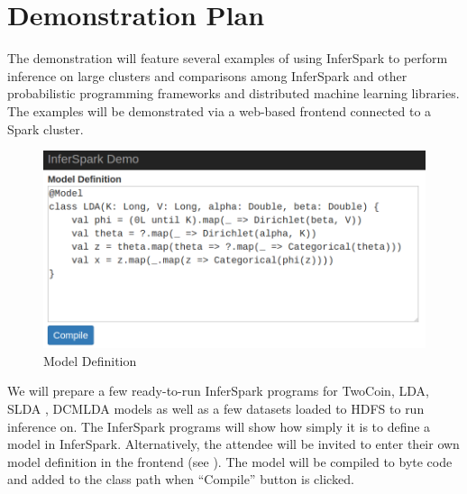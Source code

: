\section{Demonstration Plan}
\label{sec:demoplan}


The demonstration will feature several examples of using InferSpark to perform
inference on large clusters and comparisons among InferSpark and other
probabilistic programming frameworks and distributed machine learning
libraries. The examples will be demonstrated via a web-based frontend
connected to a Spark cluster.

\begin{figure}[!h]
    \includegraphics[width=\linewidth]{figs/demo_modeldef.png}
    \vspace*{-10pt}
    \caption{Model Definition}
    \label{fig:demo_modeldef}
\end{figure}

We will prepare a few ready-to-run InferSpark programs for TwoCoin, LDA, 
SLDA \cite{Jo2011}, DCMLDA \cite{Doyle2009} models as well as 
a few datasets loaded to HDFS to run inference on.
The InferSpark programs will show how simply it is to define a model in
InferSpark.  Alternatively, the attendee will be invited to enter their own
model definition in the frontend (see ).  The model
will be compiled to byte code and added to the class path when ``Compile''
button is clicked.

